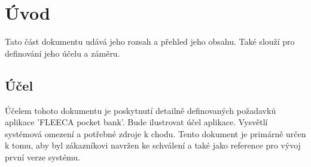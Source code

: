 \documentclass[FM,SP]{tulthesis}
\newcommand{\appName}{FLEECA pocket bank}
\newcommand{\appNameQ}{'\appName'}
\begin{document}








\tableofcontents

\clearpage


\chapter{Úvod}
Tato část dokumentu udává jeho rozsah a přehled jeho obsahu. Také slouží pro definování jeho účelu a záměru.

\section{Účel}
Účelem tohoto dokumentu je poskytnutí detailně definovaných požadavků aplikace \appNameQ. Bude ilustrovat účel aplikace. Vysvětlí systémová omezení a potřebné zdroje k chodu. Tento dokument je primárně určen k tomu, aby byl zákazníkovi navržen ke schválení a také jako reference pro vývoj první verze systému.
\end{document}
